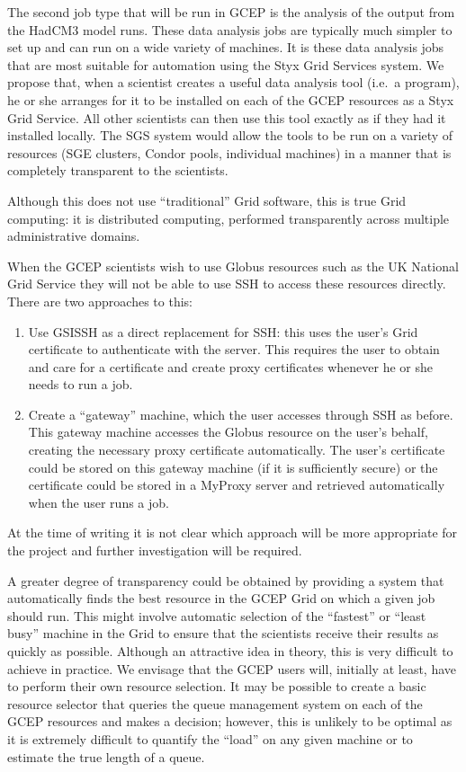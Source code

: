 \documentclass[times,10pt,twocolumn]{article}
\begin{document}
The second job type that will be run in GCEP is the analysis of the output from the HadCM3 model runs.  These data analysis jobs are typically much simpler to set up and can run on a wide variety of machines.  It is these data analysis jobs that are most suitable for automation using the Styx Grid Services system.  We propose that, when a scientist creates a useful data analysis tool (i.e.\ a program), he or she arranges for it to be installed on each of the GCEP resources as a Styx Grid Service.  All other scientists can then use this tool exactly as if they had it installed locally.  The SGS system would allow the tools to be run on a variety of resources (SGE clusters, Condor pools, individual machines) in a manner that is completely transparent to the scientists.

Although this does not use ``traditional'' Grid software, this is true Grid computing: it is distributed computing, performed transparently across multiple administrative domains.

When the GCEP scientists wish to use Globus resources such as the UK National Grid Service they will not be able to use SSH to access these resources directly.  There are two approaches to this:

\begin{enumerate}
\item Use GSISSH as a direct replacement for SSH: this uses the user's Grid certificate to authenticate with the server.  This requires the user to obtain and care for a certificate and create proxy certificates whenever he or she needs to run a job.
\item Create a ``gateway'' machine, which the user accesses through SSH as before. This gateway machine accesses the Globus resource on the user's behalf, creating the necessary proxy certificate automatically.  The user's certificate could be stored on this gateway machine (if it is sufficiently secure) or the certificate could be stored in a MyProxy server and retrieved automatically when the user runs a job.
\end{enumerate}

At the time of writing it is not clear which approach will be more appropriate for the project and further investigation will be required.

A greater degree of transparency could be obtained by providing a system that automatically finds the best resource in the GCEP Grid on which a given job should run.  This might involve automatic selection of the ``fastest'' or ``least busy'' machine in the Grid to ensure that the scientists receive their results as quickly as possible.  Although an attractive idea in theory, this is very difficult to achieve in practice.  We envisage that the GCEP users will, initially at least, have to perform their own resource selection.  It may be possible to create a basic resource selector that queries the queue management system on each of the GCEP resources and makes a decision; however, this is unlikely to be optimal as it is extremely difficult to quantify the ``load'' on any given machine or to estimate the true length of a queue.
\end{document}
